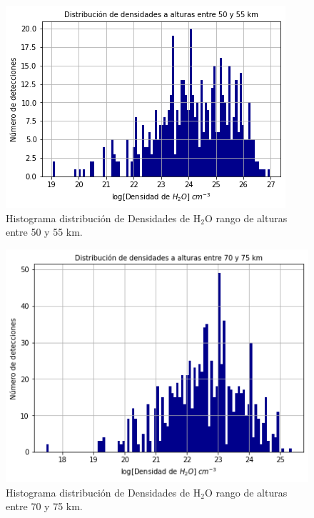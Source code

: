 \documentclass[a4paper,alpha-refs]{eSpectra}
\begin{document}
\begin{figure}[htp]
	\includegraphics[width=\columnwidth, scale=1]{Imagenes/Hist_M50.png}
    \caption{Histograma distribuci\'on de Densidades de H$_2$O rango de alturas entre 50 y 55 km.}
    \label{fig:hist_M50}
\end{figure}

\begin{figure}[htp]
	\includegraphics[width=\columnwidth, scale=1]{Imagenes/Hist_M70.png}
    \caption{Histograma distribuci\'on de Densidades de H$_2$O rango de alturas entre 70 y 75 km.}
    \label{fig:hist_M70}
\end{figure}
\end{document}

